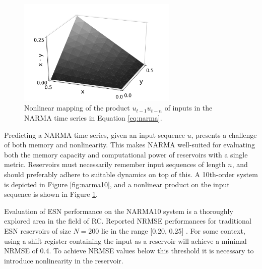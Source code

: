 \begin{figure}[t!]
  \centering
  \includegraphics[width=3.0in]{figures/NARMA-nonlinearity.png}
  \caption{
    Nonlinear mapping of the product $u_{t-1}u_{t-n}$ of inputs in the NARMA
time series in Equation \protect\ref{eq:narma}.
  }
  \label{fig:narma-nonlinearity}
\end{figure}

Predicting a NARMA time series, given an input sequence $u$, presents a
challenge of both memory and nonlinearity. This makes NARMA well-suited for
evaluating both the memory capacity and computational power of reservoirs with a
single metric. Reservoirs must necessarily remember input sequences of length
$n$, and should preferably adhere to suitable dynamics on top of this. A
10th-order system is depicted in Figure \ref{fig:narma10}, and a nonlinear
product on the input sequence is shown in Figure \ref{fig:narma-nonlinearity}.

Evaluation of ESN performance on the NARMA10 system is a thoroughly explored
area in the field of RC. Reported NRMSE performances for traditional ESN
reservoirs of size $N = 200$ lie in the range [0.20, 0.25]
\cite{verstraeten_experimental_2007, rodan_minimum_2011,
goudarzi_comparative_2014, jaeger_adaptive_2003}. For some context, using a
shift register containing the input as a reservoir will achieve a minimal NRMSE
of 0.4. To achieve NRMSE values below this threshold it is necessary to
introduce nonlinearity in the reservoir.

